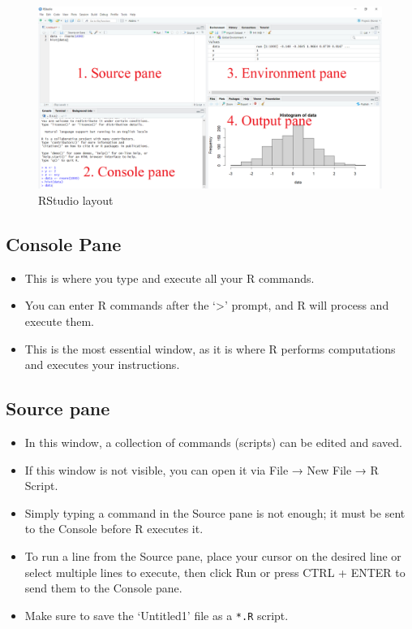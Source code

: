 \documentclass[
  letterpaper,
  DIV=11,
  numbers=noendperiod]{scrreprt}
\begin{document}
\begin{figure}[H]

{\centering \includegraphics[width=1\textwidth,height=\textheight]{fig/1_Rstudio_Layout.png}

}

\caption{RStudio layout}

\end{figure}%

\subsection{Console Pane}\label{console-pane}

\begin{itemize}
\item
  This is where you type and execute all your R commands.
\item
  You can enter R commands after the `\textgreater{}' prompt, and R will
  process and execute them.
\item
  This is the most essential window, as it is where R performs
  computations and executes your instructions.
\end{itemize}

\subsection{Source pane}\label{source-pane}

\begin{itemize}
\item
  In this window, a collection of commands (scripts) can be edited and
  saved.
\item
  If this window is not visible, you can open it via File → New File → R
  Script.
\item
  Simply typing a command in the Source pane is not enough; it must be
  sent to the Console before R executes it.
\item
  To run a line from the Source pane, place your cursor on the desired
  line or select multiple lines to execute, then click Run or press CTRL
  + ENTER to send them to the Console pane.
\item
  Make sure to save the `Untitled1' file as a \texttt{*.R} script.
\end{itemize}
\end{document}
